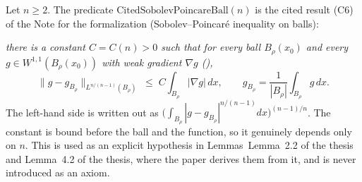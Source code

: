 \begin{definition}
Let $n\ge2$.  The predicate $\mathrm{CitedSobolevPoincareBall}(n)$ is the cited
result (C6) of the Note for the formalization (Sobolev--Poincar\'e inequality on
balls):

\emph{there is a constant $C=C(n)>0$ such that for every ball $B_\rho(x_0)$ and
every $g\in W^{1,1}(B_\rho(x_0))$ with weak gradient $\nabla g$
(),}
\[
\|g-g_{B_\rho}\|_{L^{n/(n-1)}(B_\rho)}\;\le\;C\int_{B_\rho}|\nabla g|\,dx ,
\qquad
g_{B_\rho}=\frac{1}{|B_\rho|}\int_{B_\rho}g\,dx .
\]
The left-hand side is written out as
$\bigl(\int_{B_\rho}|g-g_{B_\rho}|^{n/(n-1)}dx\bigr)^{(n-1)/n}$.  The constant is
bound before the ball and the function, so it genuinely depends only on $n$.
This is used as an explicit hypothesis in Lemmas~Lemma~2.2 of the thesis and
Lemma~4.2 of the thesis, where the paper derives them from it, and is never introduced as
an axiom.
\end{definition}
